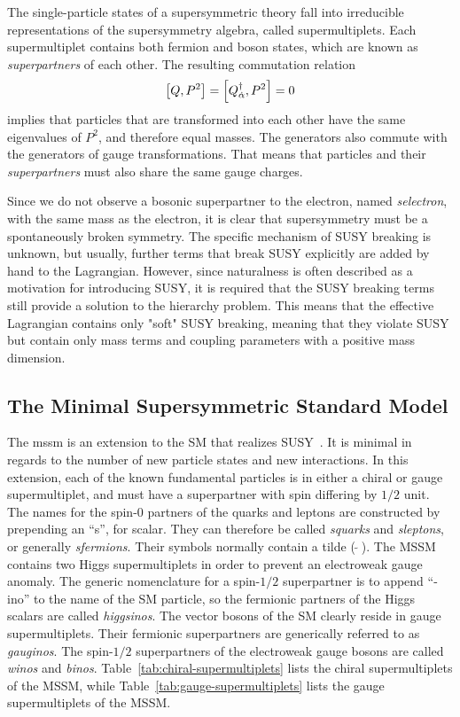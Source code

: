 The single-particle states of a supersymmetric theory fall into irreducible representations of the supersymmetry algebra, called supermultiplets. Each supermultiplet contains both fermion and boson states, which are known as \emph{superpartners} of each other. The resulting commutation relation
\begin{equation}
\comm{Q}{P^2}=\comm{Q^{\dagger}_{\dot{\alpha}}}{P^2}=0
\end{equation}
implies that particles that are transformed into each other have the same eigenvalues of $P^2$, and therefore equal masses. The generators also commute with the generators of gauge transformations. That means that particles and their \emph{superpartners} must also share the same gauge charges.

Since we do not observe a bosonic superpartner to the electron, named \emph{selectron}, with the same mass as the electron, it is clear that supersymmetry must be a spontaneously broken symmetry. The specific mechanism of SUSY breaking is unknown, but usually, further terms that break SUSY explicitly are added by hand to the Lagrangian. However, since naturalness is often described as a motivation for introducing SUSY, it is required that the SUSY breaking terms still provide a solution to the hierarchy problem. This means that the effective Lagrangian contains only "soft" SUSY breaking, meaning that they violate SUSY but contain only mass terms and coupling parameters with a positive mass dimension.

\subsection{The Minimal Supersymmetric Standard Model}
\label{sec:MSSM}

The \gls{mssm} is an extension to the SM that realizes SUSY~\cite{MARTIN_1998}. It is minimal in regards to the number of new particle states and new interactions. In this extension, each of the known fundamental particles is in either a chiral or gauge supermultiplet, and must have a superpartner with spin differing by $1/2$ unit. The names for the spin-0 partners of the quarks and leptons are constructed by prepending an “s”, for scalar. They can therefore be called \emph{squarks} and \emph{sleptons}, or generally \emph{sfermions}. Their symbols normally contain a tilde ($\widetilde{\,\,\,}$). The MSSM contains two Higgs supermultiplets in order to prevent an electroweak gauge anomaly. The generic nomenclature for a spin-$1/2$ superpartner is to append “-ino” to the name of the SM particle, so the fermionic partners of the Higgs scalars are called \emph{higgsinos}. The vector bosons of the SM clearly reside in gauge supermultiplets. Their fermionic superpartners are generically referred to as \emph{gauginos}. The spin-$1/2$ superpartners of the electroweak gauge bosons are called \emph{winos} and \emph{binos}. Table~\ref{tab:chiral-supermultiplets} lists the chiral supermultiplets of the MSSM, while Table~\ref{tab:gauge-supermultiplets} lists the gauge supermultiplets of the MSSM.

